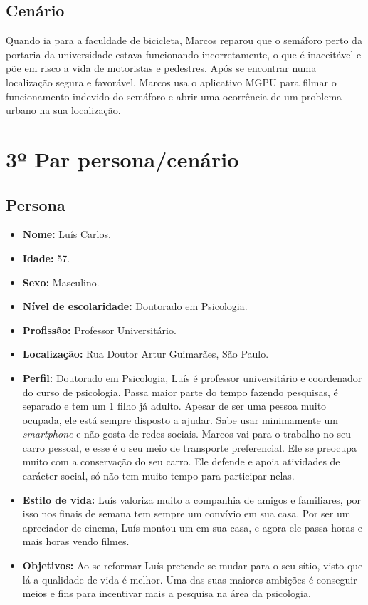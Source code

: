 \documentclass[a4paper,12pt,twoside]{report}
\begin{document}
\subsection{Cenário}
Quando ia para a faculdade de bicicleta, Marcos reparou que o semáforo perto da portaria da universidade estava funcionando incorretamente, o que é inaceitável e põe em risco a vida de motoristas e pedestres. Após se encontrar numa localização segura e favorável, Marcos usa o aplicativo MGPU para filmar o funcionamento indevido do semáforo e abrir uma ocorrência de um problema urbano na sua localização.

\clearpage
 
\section{3º Par persona/cenário}
\subsection{Persona}
\begin{itemize}
\item \textbf{Nome:} Luís Carlos.
\item \textbf{Idade:} 57.
\item \textbf{Sexo:} Masculino.
\item \textbf{Nível de escolaridade:} Doutorado em Psicologia.
\item \textbf{Profissão:} Professor Universitário.
\item \textbf{Localização:} Rua Doutor Artur Guimarães, São Paulo.
\item \textbf{Perfil:} Doutorado em Psicologia, Luís é professor universitário e coordenador do curso de psicologia. Passa maior parte do tempo fazendo pesquisas, é separado e tem um 1 filho já adulto. Apesar de ser uma pessoa muito ocupada, ele está sempre disposto a ajudar. Sabe usar minimamente um \textit{smartphone} e não gosta de redes sociais. Marcos vai para o trabalho no seu carro pessoal, e esse é o seu meio de transporte preferencial. Ele se preocupa muito com a conservação do seu carro. Ele defende e apoia atividades de carácter social, só não tem muito tempo para participar nelas. 
\item \textbf{Estilo de vida:}
Luís valoriza muito a companhia de amigos e familiares, por isso nos finais de semana tem sempre um convívio em sua casa. Por ser um apreciador de cinema, Luís montou um em sua casa, e agora ele passa horas e mais horas vendo filmes. 
\item \textbf{Objetivos:} Ao se reformar Luís pretende se mudar para o seu sítio, visto que lá a qualidade de vida é melhor. Uma das suas maiores ambições é conseguir meios e fins para incentivar mais a pesquisa na área da psicologia.
\end{itemize}
\end{document}

